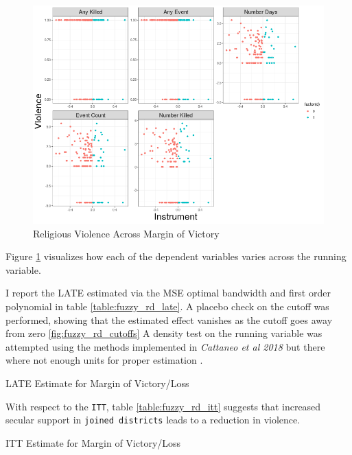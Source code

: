 \documentclass{scrartcl}
\begin{document}
\begin{figure}[h!]
  \centering
  \includegraphics[width=0.9\linewidth]{replication/output/fuzzy_rd_data.png}
  \caption{Religious Violence Across Margin of Victory}
  \label{fig:fuzzy_rd_data}
\end{figure}

Figure \ref{fig:fuzzy_rd_data} visualizes how each of the dependent variables varies across the running variable. 




I report the LATE estimated via the MSE optimal bandwidth and first order polynomial in table \ref{table:fuzzy_rd_late}.
A placebo check on the cutoff was performed, showing that the estimated effect vanishes as the cutoff goes away from zero \ref{fig:fuzzy_rd_cutoffs}
A density test on the running variable was attempted using the methods implemented in \textit{Cattaneo et al 2018} but there where not enough units for proper estimation \cite{cattaneo_2018}.

\begin{table}[h!]
  \begin{center}
    \scalebox{0.75}{
      
    }
    \caption{LATE Estimate for Margin of Victory/Loss}
    \label{table:fuzzy_rd_late}
  \end{center}
\end{table}


With respect to the \texttt{ITT}, table \ref{table:fuzzy_rd_itt} suggests that increased secular support in \texttt{joined districts} leads to a reduction in violence.

\begin{table}[h!]
  \begin{center}
    \scalebox{0.65}{
      
    }
    \caption{ITT Estimate for Margin of Victory/Loss}
    \label{table:fuzzy_rd_itt}
  \end{center}
\end{table}
\end{document}
